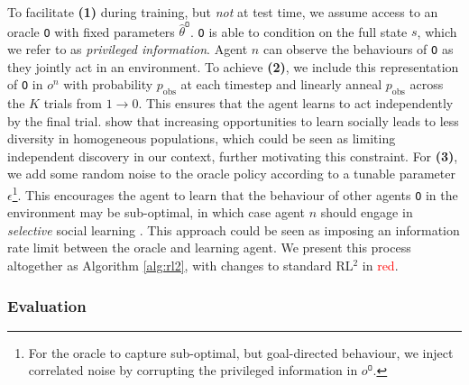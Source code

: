 \documentclass{article}
\begin{document}
To facilitate \textbf{(1)} during training, but \textit{not} at test time, we assume access to an oracle \texttt{O} with fixed parameters $\hat{\theta}^\texttt{O}$. \texttt{O} is able to condition on the full state $s$, which we refer to as \textit{privileged information}. Agent $n$ can observe the behaviours of \texttt{O} as they jointly act in an environment. To achieve \textbf{(2)}, we include this representation of \texttt{O} in $o^n$ with probability $p_\text{obs}$ at each timestep and linearly anneal $p_\text{obs}$ across the $K$ trials from $1 \to 0$. This ensures that the agent learns to act independently by the final trial. \cite{perez23} show that increasing opportunities to learn socially leads to less diversity in homogeneous populations, which could be seen as limiting independent discovery in our context, further motivating this constraint. For \textbf{(3)}, we add some random noise to the oracle policy according to a tunable parameter $\epsilon$\footnote{For the oracle to capture sub-optimal, but goal-directed behaviour, we inject correlated noise by corrupting the privileged information in $o^\texttt{O}$.}. This encourages the agent to learn that the behaviour of other agents \texttt{O} in the environment may be sub-optimal, in which case agent $n$ should engage in \textit{selective} social learning \citep{poulin16}. This approach could be seen as imposing an information rate limit \citep{prystawski23} between the oracle and learning agent. We present this process altogether as Algorithm \ref{alg:rl2}, with changes to standard RL$^2$ in \textcolor{red}{red}.

\subsubsection{Evaluation}
\label{eval}
\end{document}
